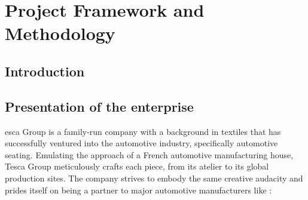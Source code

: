 %
%
\chapter{Project Framework and Methodology}
\section*{Introduction}
\section{Presentation of the  enterprise}
esca Group is a family-run company with a background in textiles that has successfully ventured into the automotive industry, specifically automotive seating. Emulating the approach of a French automotive manufacturing house, Tesca Group meticulously crafts each piece, from its atelier to its global production sites. The company strives to embody the same creative audacity and prides itself on being a partner to major automotive manufacturers like : 



